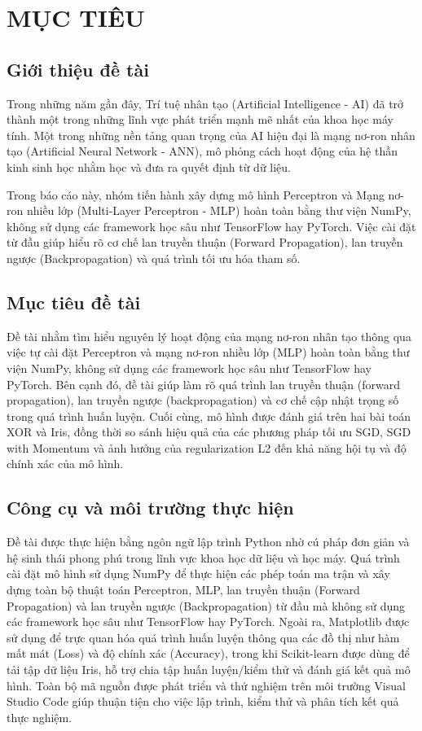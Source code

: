 \documentclass[12pt,a4paper]{report}
\begin{document}

\chapter{MỤC TIÊU}

\section{Giới thiệu đề tài}
Trong những năm gần đây, Trí tuệ nhân tạo (Artificial Intelligence - AI) đã trở thành một trong những lĩnh vực phát triển mạnh mẽ nhất của khoa học máy tính. Một trong những nền tảng quan trọng của AI hiện đại là mạng nơ-ron nhân tạo (Artificial Neural Network - ANN), mô phỏng cách hoạt động của hệ thần kinh sinh học nhằm học và đưa ra quyết định từ dữ liệu.

Trong báo cáo này, nhóm tiến hành xây dựng mô hình Perceptron và Mạng nơ-ron nhiều lớp (Multi-Layer Perceptron - MLP) hoàn toàn bằng thư viện NumPy, không sử dụng các framework học sâu như TensorFlow hay PyTorch. Việc cài đặt từ đầu giúp hiểu rõ cơ chế lan truyền thuận (Forward Propagation), lan truyền ngược (Backpropagation) và quá trình tối ưu hóa tham số.

\section{Mục tiêu đề tài}
Đề tài nhằm tìm hiểu nguyên lý hoạt động của mạng nơ-ron nhân tạo thông qua việc tự cài đặt Perceptron và mạng nơ-ron nhiều lớp (MLP) hoàn toàn bằng thư viện NumPy, không sử dụng các framework học sâu như TensorFlow hay PyTorch. Bên cạnh đó, đề tài giúp làm rõ quá trình lan truyền thuận (forward propagation), lan truyền ngược (backpropagation) và cơ chế cập nhật trọng số trong quá trình huấn luyện. Cuối cùng, mô hình được đánh giá trên hai bài toán XOR và Iris, đồng thời so sánh hiệu quả của các phương pháp tối ưu SGD, SGD with Momentum và ảnh hưởng của regularization L2 đến khả năng hội tụ và độ chính xác của mô hình.

\section{Công cụ và môi trường thực hiện}
Đề tài được thực hiện bằng ngôn ngữ lập trình Python nhờ cú pháp đơn giản và hệ sinh thái phong phú trong lĩnh vực khoa học dữ liệu và học máy. Quá trình cài đặt mô hình sử dụng NumPy để thực hiện các phép toán ma trận và xây dựng toàn bộ thuật toán Perceptron, MLP, lan truyền thuận (Forward Propagation) và lan truyền ngược (Backpropagation) từ đầu mà không sử dụng các framework học sâu như TensorFlow hay PyTorch. Ngoài ra, Matplotlib được sử dụng để trực quan hóa quá trình huấn luyện thông qua các đồ thị như hàm mất mát (Loss) và độ chính xác (Accuracy), trong khi Scikit-learn được dùng để tải tập dữ liệu Iris, hỗ trợ chia tập huấn luyện/kiểm thử và đánh giá kết quả mô hình. Toàn bộ mã nguồn được phát triển và thử nghiệm trên môi trường Visual Studio Code giúp thuận tiện cho việc lập trình, kiểm thử và phân tích kết quả thực nghiệm.
\end{document}
